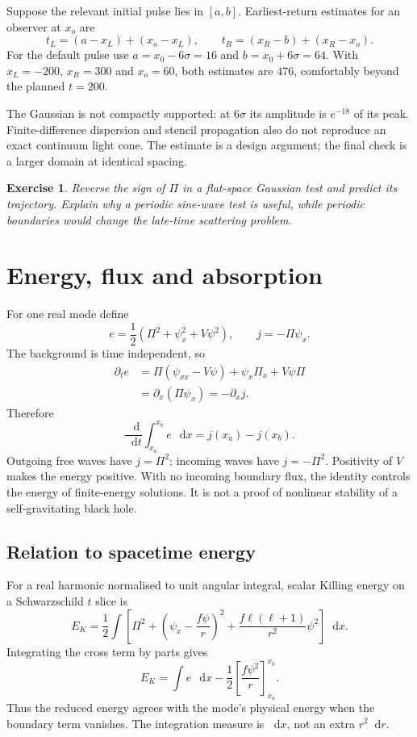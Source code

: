 \documentclass[11pt,a4paper]{article}
\numberwithin{equation}{section}
\newtheorem{exercise}{Exercise}[section]
\newcommand{\dd}{\mathop{}\!\mathrm{d}}
\newcommand{\pd}{\partial}
\begin{document}
Suppose the relevant initial pulse lies in $[a,b]$. Earliest-return estimates
for an observer at $x_o$ are
\begin{equation}
 t_L=(a-x_L)+(x_o-x_L),\qquad
 t_R=(x_R-b)+(x_R-x_o).
\end{equation}
For the default pulse use $a=x_0-6\sigma=16$ and $b=x_0+6\sigma=64$.
With $x_L=-200$, $x_R=300$ and $x_o=60$, both estimates are $476$,
comfortably beyond the planned $t=200$.

The Gaussian is not compactly supported: at $6\sigma$ its amplitude is
$e^{-18}$ of its peak. Finite-difference dispersion and stencil propagation
also do not reproduce an exact continuum light cone. The estimate is a
design argument; the final check is a larger domain at identical spacing.

\begin{exercise}
Reverse the sign of $\Pi$ in a flat-space Gaussian test and predict its
trajectory. Explain why a periodic sine-wave test is useful, while periodic
boundaries would change the late-time scattering problem.
\end{exercise}

\section{Energy, flux and absorption}\label{sec:energy}

For one real mode define
\begin{equation}
 e=\frac12(\Pi^2+\psi_x^2+V\psi^2),\qquad j=-\Pi\psi_x .
\end{equation}
The background is time independent, so
\begin{align}
 \pd_t e&=\Pi(\psi_{xx}-V\psi)+\psi_x\Pi_x+V\psi\Pi\\
 &=\pd_x(\Pi\psi_x)=-\pd_x j .
\end{align}
Therefore
\begin{equation}\label{eq:energybalance}
 \frac{\dd}{\dd t}\int_{x_a}^{x_b}e\,\dd x=j(x_a)-j(x_b).
\end{equation}
Outgoing free waves have $j=\Pi^2$; incoming waves have $j=-\Pi^2$.
Positivity of $V$ makes the energy positive. With no incoming boundary flux,
the identity controls the energy of finite-energy solutions. It is not a
proof of nonlinear stability of a self-gravitating black hole.

\subsection{Relation to spacetime energy}
For a real harmonic normalised to unit angular integral, scalar Killing
energy on a Schwarzschild $t$ slice is
\begin{equation}
 E_K=\frac12\int\left[
 \Pi^2+\left(\psi_x-\frac{f\psi}{r}\right)^2
 +\frac{f\ell(\ell+1)}{r^2}\psi^2\right]\dd x .
\end{equation}
Integrating the cross term by parts gives
\begin{equation}
 E_K=\int e\,\dd x-\frac12\left[\frac{f\psi^2}{r}\right]_{x_a}^{x_b}.
\end{equation}
Thus the reduced energy agrees with the mode's physical energy when the
boundary term vanishes. The integration measure is $\dd x$, not an extra
$r^2\dd r$.
\end{document}

